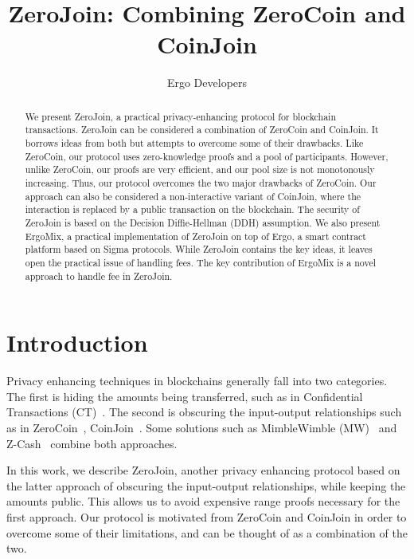 \documentclass[11pt]{article}
\newcommand{\mixname}{ErgoMix\xspace}
\begin{document}
\newcommand{\algname}{ZeroJoin\xspace}
\title{\algname: Combining ZeroCoin and CoinJoin}
\author{Ergo Developers}
\maketitle

\begin{abstract}

We present \algname, a practical privacy-enhancing protocol for blockchain transactions. \algname can be considered a combination of ZeroCoin and CoinJoin. It borrows ideas from both but attempts to overcome some of their drawbacks.
Like ZeroCoin, our protocol uses zero-knowledge proofs and a pool of
participants. However, unlike ZeroCoin, our proofs are very efficient, and our pool size is not monotonously increasing.
Thus, our protocol overcomes the two major drawbacks of ZeroCoin. Our approach can also be considered a non-interactive variant of CoinJoin, where the interaction is replaced by a public transaction on the blockchain. The security of \algname is based on the Decision Diffie-Hellman (DDH) assumption. 
We also present \mixname, a practical implementation of \algname on top of Ergo, a smart contract platform based on Sigma protocols. While \algname contains the key ideas, it leaves open the practical issue of handling fees. The key contribution of \mixname is a novel approach to handle fee in \algname. 

\end{abstract}

\section{Introduction}
\label{intro}

Privacy enhancing techniques in blockchains generally fall into two categories. The first is hiding the amounts being transferred, such as in Confidential Transactions (CT)~\cite{ct}. The second is obscuring the input-output relationships such as in ZeroCoin~\cite{zerocoin}, CoinJoin~\cite{coinjoin}. Some solutions such as MimbleWimble (MW)~\cite{mw} and Z-Cash~\cite{zcash,zcash1} combine both approaches.

In this work, we describe \algname, another privacy enhancing protocol based on the latter approach of obscuring the input-output relationships, while keeping the amounts public. This allows us to avoid expensive range proofs necessary for the first approach. Our protocol is motivated from ZeroCoin and CoinJoin in order to overcome some of their limitations, and can be thought of as a combination of the two.
\end{document}
